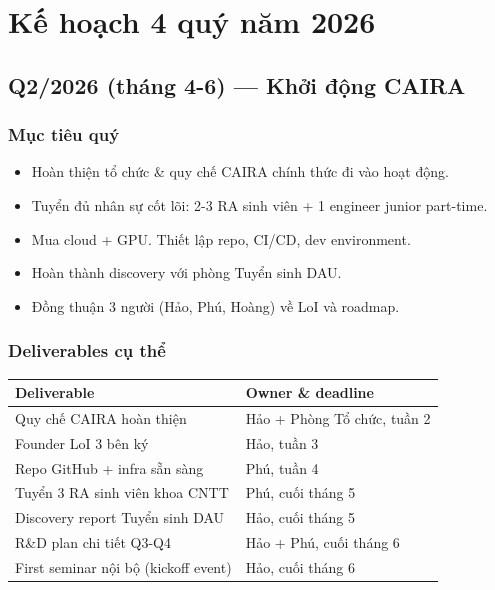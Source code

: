 \documentclass[11pt,a4paper]{article}
\begin{document}
\clearpage

\section{Kế hoạch 4 quý năm 2026}

\subsection{Q2/2026 (tháng 4-6) — Khởi động CAIRA}

\subsubsection*{Mục tiêu quý}

\begin{itemize}
\item Hoàn thiện tổ chức \& quy chế CAIRA chính thức đi vào hoạt động.
\item Tuyển đủ nhân sự cốt lõi: 2-3 RA sinh viên + 1 engineer junior part-time.
\item Mua cloud + GPU. Thiết lập repo, CI/CD, dev environment.
\item Hoàn thành discovery với phòng Tuyển sinh DAU.
\item Đồng thuận 3 người (Hảo, Phú, Hoàng) về LoI và roadmap.
\end{itemize}

\subsubsection*{Deliverables cụ thể}

\begin{tabularx}{\linewidth}{@{}p{3.5cm} X@{}}
\toprule
\textbf{Deliverable} & \textbf{Owner \& deadline} \\
\midrule
Quy chế CAIRA hoàn thiện & Hảo + Phòng Tổ chức, tuần 2 \\
Founder LoI 3 bên ký & Hảo, tuần 3 \\
Repo GitHub + infra sẵn sàng & Phú, tuần 4 \\
Tuyển 3 RA sinh viên khoa CNTT & Phú, cuối tháng 5 \\
Discovery report Tuyển sinh DAU & Hảo, cuối tháng 5 \\
R\&D plan chi tiết Q3-Q4 & Hảo + Phú, cuối tháng 6 \\
First seminar nội bộ (kickoff event) & Hảo, cuối tháng 6 \\
\bottomrule
\end{tabularx}
\end{document}
